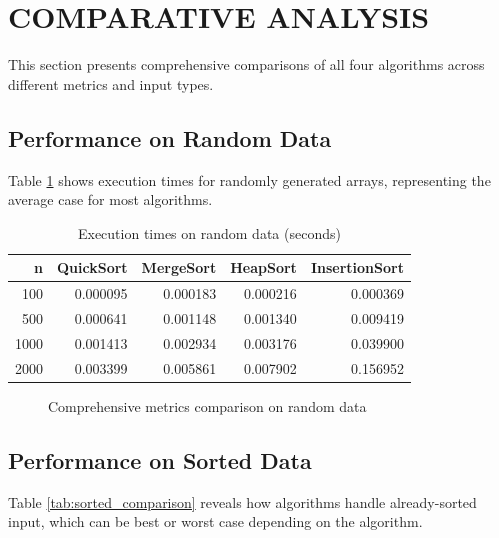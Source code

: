 \documentclass[12pt]{article}
\begin{document}
\clearpage
\section{COMPARATIVE ANALYSIS}

This section presents comprehensive comparisons of all four algorithms across different metrics and input types.

\subsection{Performance on Random Data}

Table \ref{tab:random_comparison} shows execution times for randomly generated arrays, representing the average case for most algorithms.

\begin{table}[H]
\centering
\caption{Execution times on random data (seconds)}
\label{tab:random_comparison}
\small
\begin{tabular}{@{}rrrrr@{}}
\toprule
\textbf{n} & \textbf{QuickSort} & \textbf{MergeSort} & \textbf{HeapSort} & \textbf{InsertionSort} \\ 
\midrule
100   & 0.000095 & 0.000183 & 0.000216 & 0.000369 \\ 
500   & 0.000641 & 0.001148 & 0.001340 & 0.009419 \\ 
1000  & 0.001413 & 0.002934 & 0.003176 & 0.039900 \\ 
2000  & 0.003399 & 0.005861 & 0.007902 & 0.156952 \\ 
\bottomrule
\end{tabular}
\end{table}

\begin{figure}[H]
    \centering
    \caption{Comprehensive metrics comparison on random data}
    \label{fig:all_metrics_random}
\end{figure}

\subsection{Performance on Sorted Data}

Table \ref{tab:sorted_comparison} reveals how algorithms handle already-sorted input, which can be best or worst case depending on the algorithm.
\end{document}
